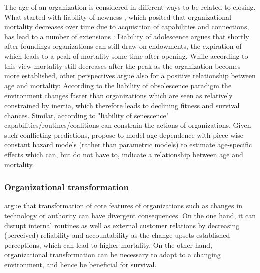 \documentclass[11pt]{article}
\begin{document}
The age of an organization is considered in different ways to be related to closing.
What started with liability of newness \parencite{Stinchcombe_1965_structure}, which posited that organizational mortality decreases over time due to acquisition of capabilities and connections, has lead to a number of extensions \parencite{Carroll_Khessina_2019_demography,Hannan_1998_mortality}:
Liability of adolescence argues that shortly after foundings organizations can still draw on endowments, the expiration of which leads to a peak of mortality some time after opening.
While according to this view mortality still decreases after the peak as the organization becomes more established, other perspectives argue also for a positive relationship between age and mortality:
According to the liability of obsolescence paradigm the environment changes faster than organizations which are seen as relatively constrained by inertia, which therefore leads to declining fitness and survival chances.
Similar, according to "liability of senescence" capabilities/routines/coalitions can constrain the actions of organizations.
Given such conflicting predictions, \textcite{Carroll_Khessina_2019_demography} propose to model age dependence with piece-wise constant hazard models (rather than parametric models) to estimate age-specific effects which can, but do not have to, indicate a relationship between age and mortality.



\subsubsection*{Organizational transformation}

\textcite{Carroll_Khessina_2019_demography} argue that transformation of core features of organizations such as changes in technology or authority can have divergent consequences. 
On the one hand, it can disrupt internal routines as well as external customer relations by decreasing (perceived) reliability and accountability as the change upsets established perceptions, which can lead to higher mortality. 
On the other hand, organizational transformation can be necessary to adapt to a changing environment, and hence be beneficial for survival.
\end{document}
